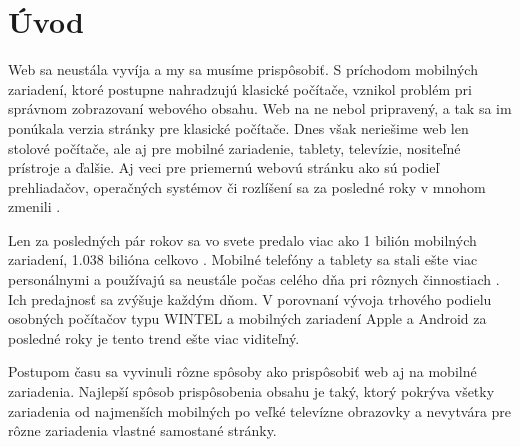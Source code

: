 \section{Úvod} %
\label{sec:_vod}



Web sa neustála vyvíja a my sa musíme prispôsobiť. S príchodom mobilných zariadení, ktoré postupne nahradzujú klasické počítače, vznikol problém pri správnom zobrazovaní webového obsahu. Web na ne nebol pripravený, a tak sa im ponúkala verzia stránky pre klasické počítače. Dnes však neriešime web len stolové počítače, ale aj pre mobilné zariadenie, tablety, televízie, nositeľné prístroje a ďalšie. Aj veci pre priemernú webovú stránku ako sú podieľ prehliadačov, operačných systémov či rozlíšení sa za posledné roky v mnohom zmenili \cite{ui17}.

Len za posledných pár rokov sa vo svete predalo viac ako 1 bilión mobilných zariadení, 1.038 bilióna celkovo \cite{bilion}. Mobilné telefóny a tablety sa stali ešte viac personálnymi a používajú sa neustále počas celého dňa pri rôznych činnostiach \cite{mobileuse, smarthopenseveryday, tabletuse}. Ich predajnosť sa zvýšuje každým dňom. V porovnaní vývoja trhového podielu osobných počítačov typu WINTEL a mobilných zariadení Apple a Android za posledné roky je tento trend ešte viac viditeľný.

Postupom času sa vyvinuli rôzne spôsoby ako prispôsobiť web aj na mobilné zariadenia. Najlepší spôsob prispôsobenia obsahu je taký, ktorý pokrýva všetky zariadenia od najmenších mobilných po veľké televízne obrazovky a nevytvára pre rôzne zariadenia vlastné samostané stránky.

